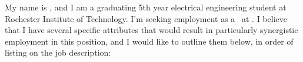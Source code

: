 My name is \name, and I am a graduating 5th year electrical engineering 
student at Rochester Institute of Technology. I'm seeking employment 
as a \targetpos\ at \company. I believe that I have several specific 
attributes that would result in particularly synergistic employment in 
this position, and I would like to outline them below, in order of 
listing on the job description: